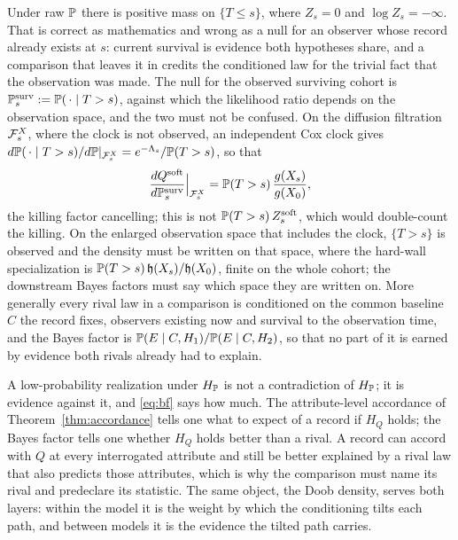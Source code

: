 \begin{remark}\label{rem:survnull}
Under raw $\mathbb{P}$ there is positive mass on $\{T\le s\}$, where
$Z_s=0$ and $\log Z_s=-\infty$. That is correct as mathematics and
wrong as a null for an observer whose record already exists at $s$:
current survival is evidence both hypotheses share, and a comparison
that leaves it in credits the conditioned law for the trivial fact that
the observation was made. The null for the observed surviving cohort is
$\mathbb{P}^{\mathrm{surv}}_s:=\mathbb{P}(\,\cdot\mid T>s)$, against which the likelihood ratio depends on the observation space, and the two must not be confused. On the diffusion filtration $\mathcal{F}^X_s$, where the clock is not observed, an independent Cox clock gives $d\mathbb{P}(\,\cdot\mid T>s)/d\mathbb{P}|_{\mathcal{F}^X_s}=e^{-\Lambda_s}/\mathbb{P}(T>s)$, so that \begin{equation}\label{eq:survlr} \frac{dQ^{\mathrm{soft}}}{d\mathbb{P}^{\mathrm{surv}}_s}\Big|_{\mathcal{F}^X_s}=\mathbb{P}(T>s)\,\frac{g(X_s)}{g(X_0)}, \end{equation} the killing factor cancelling; this is not $\mathbb{P}(T>s)\,Z^{\mathrm{soft}}_s$, which would double-count the killing. On the enlarged observation space that includes the clock, $\{T>s\}$ is observed and the density must be written on that space, where the hard-wall specialization is $\mathbb{P}(T>s)\,\mathfrak{h}(X_s)/\mathfrak{h}(X_0)$, finite on the whole cohort; the downstream Bayes factors must say which space they are written on. More generally every rival law in a
comparison is conditioned on the common baseline $C$ the record fixes,
observers existing now and survival to the observation time, and the
Bayes factor is $\mathbb{P}(E\mid C,H_1)/\mathbb{P}(E\mid C,H_2)$, so that no part of
it is earned by evidence both rivals already had to explain.
\end{remark}

\begin{remark}
\label{rem:whybf}
A low-probability realization under $H_{\mathbb{P}}$ is not a contradiction of
$H_{\mathbb{P}}$; it is evidence against it, and \eqref{eq:bf} says how much. The
attribute-level accordance of Theorem~\ref{thm:accordance} tells one what
to expect of a record if $H_Q$ holds; the Bayes factor tells one whether
$H_Q$ holds better than a rival. A record can accord with $Q$ at every
interrogated attribute and still be better explained by a rival law that
also predicts those attributes, which is why the comparison must name its
rival and predeclare its statistic. The same object, the Doob density,
serves both layers: within the model it is the weight by which the
conditioning tilts each path, and between models it is the evidence the
tilted path carries.
\end{remark}

